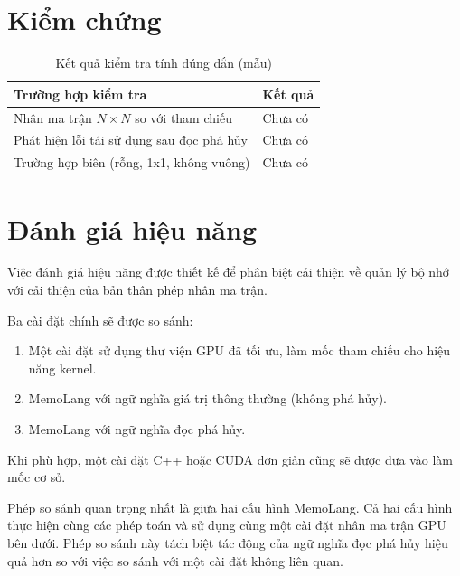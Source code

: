 \documentclass[a4paper]{article}
\begin{document}
	\section{Kiểm chứng}
	
	
	\begin{table}[h]
		\centering
		\caption{Kết quả kiểm tra tính đúng đắn (mẫu)}
		\label{tab:verification}
		\begin{tabular}{ll}
			\toprule
			Trường hợp kiểm tra & Kết quả \\
			\midrule
			Nhân ma trận $N \times N$ so với tham chiếu & Chưa có \\
			Phát hiện lỗi tái sử dụng sau đọc phá hủy & Chưa có \\
			Trường hợp biên (rỗng, 1x1, không vuông) & Chưa có \\
			\bottomrule
		\end{tabular}
	\end{table}
	
	\section{Đánh giá hiệu năng}
	
	Việc đánh giá hiệu năng được thiết kế để phân biệt cải thiện về quản lý bộ nhớ với cải thiện của bản thân phép nhân ma trận.
	
	Ba cài đặt chính sẽ được so sánh:
	
	\begin{enumerate}
		\item Một cài đặt sử dụng thư viện GPU đã tối ưu, làm mốc tham chiếu cho hiệu năng kernel.
		\item MemoLang với ngữ nghĩa giá trị thông thường (không phá hủy).
		\item MemoLang với ngữ nghĩa đọc phá hủy.
	\end{enumerate}
	
	Khi phù hợp, một cài đặt C++ hoặc CUDA đơn giản cũng sẽ được đưa vào làm mốc cơ sở.
	
	Phép so sánh quan trọng nhất là giữa hai cấu hình MemoLang. Cả hai cấu hình thực hiện cùng các phép toán và sử dụng cùng một cài đặt nhân ma trận GPU bên dưới. Phép so sánh này tách biệt tác động của ngữ nghĩa đọc phá hủy hiệu quả hơn so với việc so sánh với một cài đặt không liên quan.
	
\end{document}
